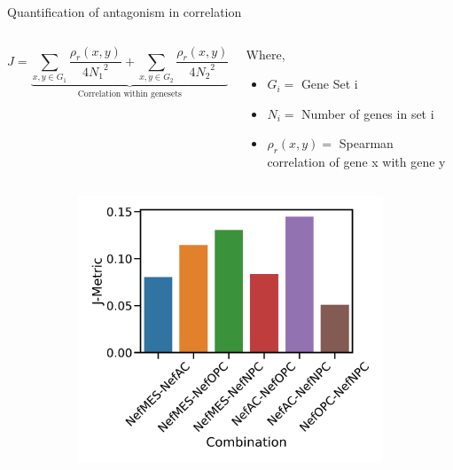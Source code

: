 \documentclass[aspectratio=169,9pt]{beamer}
\begin{document}
    \begin{frame}{Quantification of antagonism in correlation}
        \begin{columns}
            \begin{column}{0.55\textwidth}
                $$J = \underbrace{\sum_{x,y \in G_1} \frac{\rho_r(x,y)}{4 {N_1}^2} + \sum_{x,y \in G_2} \frac{\rho_r(x,y)}{4 {N_2}^2}}_{\text{Correlation within genesets}} - \underbrace{\sum_{x \in G_1, y \in G_2} \frac{\rho_r(x,y)}{2  N_1 N_2}}_{\text{Correlation across genesets}}$$
            \end{column}
            \begin{column}{0.45\textwidth}
                {\scriptsize Where,
                \begin{itemize}
                    \item $G_i =$ Gene Set i
                    \item $N_i =$ Number of genes in set i
                    \item $\rho_r(x,y) =$ Spearman correlation of gene x with gene y
                \end{itemize}}
            \end{column}
        \end{columns}
        \pause
        \begin{adjustwidth}{-5cm}{-5cm}
            \centering
            \begin{figure}
                \centering
                \begin{subfigure}[c]{0.27\textwidth}
                    \centering
                    \includegraphics[width=\textwidth]{GSM3828672_Consistency_Nef}

\end{subfigure}
\end{figure}
\end{adjustwidth}
\end{frame}
\end{document}
